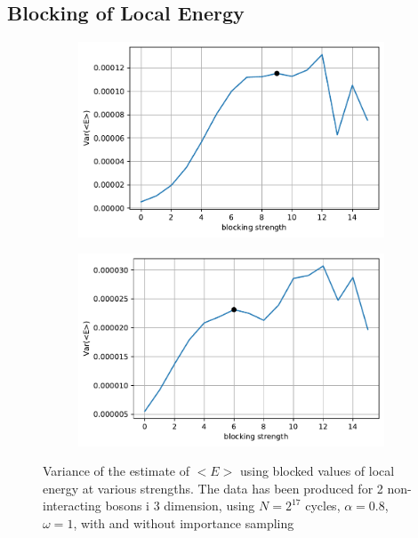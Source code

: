 \subsection{Blocking of Local Energy}
\begin{figure}
	\begin{subfigure}{\textwidth}
		\centering
		\includegraphics[width=.8\linewidth]{figures/blocking1.pdf}
	\end{subfigure}%
	\begin{subfigure}{\textwidth}
		\centering
		\includegraphics[width=.8\linewidth]{figures/blocking2.pdf}
	\end{subfigure}%
	\centering
	\caption{Variance of the estimate of $<E>$ using blocked values of local energy at various strengths. The data has been produced for 2 non-interacting bosons i 3 dimension, using $N = 2^{17}$ cycles, $\alpha = 0.8$, $\omega = 1$, with and without importance sampling}
	\label{fig:blocking1}
\end{figure}

